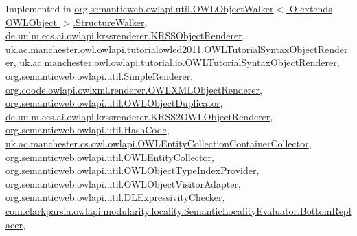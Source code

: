 Implemented in \hyperlink{classorg_1_1semanticweb_1_1owlapi_1_1util_1_1_o_w_l_object_walker_3_01_o_01extends_01_o_w_l_object_01_4_1_1_structure_walker_a1421e24ed0268d688c8e84fb25eff98d}{org.\-semanticweb.\-owlapi.\-util.\-O\-W\-L\-Object\-Walker$<$ O extends O\-W\-L\-Object $>$.\-Structure\-Walker}, \hyperlink{classde_1_1uulm_1_1ecs_1_1ai_1_1owlapi_1_1krssrenderer_1_1_k_r_s_s_object_renderer_af6eebeccac768b739382a6b0001d6502}{de.\-uulm.\-ecs.\-ai.\-owlapi.\-krssrenderer.\-K\-R\-S\-S\-Object\-Renderer}, \hyperlink{classuk_1_1ac_1_1manchester_1_1owl_1_1owlapi_1_1tutorialowled2011_1_1_o_w_l_tutorial_syntax_object_renderer_aae8b602419ab0af8206f1311ba47b0a0}{uk.\-ac.\-manchester.\-owl.\-owlapi.\-tutorialowled2011.\-O\-W\-L\-Tutorial\-Syntax\-Object\-Renderer}, \hyperlink{classuk_1_1ac_1_1manchester_1_1owl_1_1owlapi_1_1tutorial_1_1io_1_1_o_w_l_tutorial_syntax_object_renderer_ab5f11414e4325400ae84cb59c471db32}{uk.\-ac.\-manchester.\-owl.\-owlapi.\-tutorial.\-io.\-O\-W\-L\-Tutorial\-Syntax\-Object\-Renderer}, \hyperlink{classorg_1_1semanticweb_1_1owlapi_1_1util_1_1_simple_renderer_aa7c90a41bb5b000c58a34622c4d9586d}{org.\-semanticweb.\-owlapi.\-util.\-Simple\-Renderer}, \hyperlink{classorg_1_1coode_1_1owlapi_1_1owlxml_1_1renderer_1_1_o_w_l_x_m_l_object_renderer_a65d44f6ac3a80566dcaf20141fb17579}{org.\-coode.\-owlapi.\-owlxml.\-renderer.\-O\-W\-L\-X\-M\-L\-Object\-Renderer}, \hyperlink{classorg_1_1semanticweb_1_1owlapi_1_1util_1_1_o_w_l_object_duplicator_a6a4ef62c03a57150f387b5f82500c855}{org.\-semanticweb.\-owlapi.\-util.\-O\-W\-L\-Object\-Duplicator}, \hyperlink{classde_1_1uulm_1_1ecs_1_1ai_1_1owlapi_1_1krssrenderer_1_1_k_r_s_s2_o_w_l_object_renderer_a078fa2a2cac7d426aa564a570b6202b1}{de.\-uulm.\-ecs.\-ai.\-owlapi.\-krssrenderer.\-K\-R\-S\-S2\-O\-W\-L\-Object\-Renderer}, \hyperlink{classorg_1_1semanticweb_1_1owlapi_1_1util_1_1_hash_code_a979ec9f28e7c26a0b6182e8342ecdc1c}{org.\-semanticweb.\-owlapi.\-util.\-Hash\-Code}, \hyperlink{classuk_1_1ac_1_1manchester_1_1cs_1_1owl_1_1owlapi_1_1_o_w_l_entity_collection_container_collector_a90033c22df5abf666965b63993406c7a}{uk.\-ac.\-manchester.\-cs.\-owl.\-owlapi.\-O\-W\-L\-Entity\-Collection\-Container\-Collector}, \hyperlink{classorg_1_1semanticweb_1_1owlapi_1_1util_1_1_o_w_l_entity_collector_a3a7f674859daa236a6366e491cbfd5fb}{org.\-semanticweb.\-owlapi.\-util.\-O\-W\-L\-Entity\-Collector}, \hyperlink{classorg_1_1semanticweb_1_1owlapi_1_1util_1_1_o_w_l_object_type_index_provider_a284a2548c06b870dcacc3ab4fbe621b1}{org.\-semanticweb.\-owlapi.\-util.\-O\-W\-L\-Object\-Type\-Index\-Provider}, \hyperlink{classorg_1_1semanticweb_1_1owlapi_1_1util_1_1_o_w_l_object_visitor_adapter_a35c4c063d83a86286692aa4793e53d03}{org.\-semanticweb.\-owlapi.\-util.\-O\-W\-L\-Object\-Visitor\-Adapter}, \hyperlink{classorg_1_1semanticweb_1_1owlapi_1_1util_1_1_d_l_expressivity_checker_a73674f432352fe822ce73390160ec0e3}{org.\-semanticweb.\-owlapi.\-util.\-D\-L\-Expressivity\-Checker}, \hyperlink{classcom_1_1clarkparsia_1_1owlapi_1_1modularity_1_1locality_1_1_semantic_locality_evaluator_1_1_bottom_replacer_ad187ca00fa195c6c69df2607a046161d}{com.\-clarkparsia.\-owlapi.\-modularity.\-locality.\-Semantic\-Locality\-Evaluator.\-Bottom\-Replacer}, 